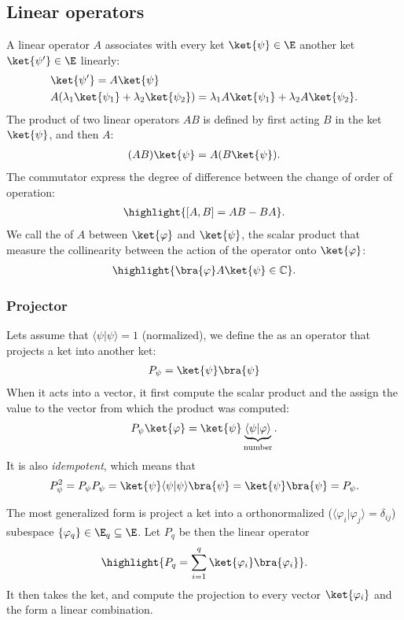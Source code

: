 \subsection{Linear operators}
A linear operator $A$ associates with every ket $\ket{\psi}\in\E$ another ket $\ket{\psi'}\in\E$ linearly:
\begin{align}
    &\ket{\psi'}=A\ket{\psi}\\
    &A(\lambda_1\ket{\psi_1}+\lambda_2\ket{\psi_2})=\lambda_1A\ket{\psi_1}+\lambda_2A\ket{\psi_2}.
\end{align} 
The product of two linear operators $AB$ is defined by first acting $B$ in the ket $\ket{\psi}$, and then $A$:
\begin{align}
    (AB)\ket{\psi}=A(B\ket{\psi}).
\end{align}
The commutator express the degree of difference between the change of order of operation:
\begin{align}
    \highlight{[A,B]=AB-BA}.
\end{align}
We call the  of $A$ between $\ket{\varphi}$ and $\ket{\psi}$, the scalar product that measure the collinearity 
between the action of the operator onto $\ket{\varphi}$:
\begin{align}
    \highlight{\bra{\varphi}A\ket{\psi}\in\mathbb{C}}.
\end{align}
\subsubsection{Projector}
Lets assume that $\langle\psi|\psi\rangle=1$ (normalized), we define the  as an operator that projects a ket into another ket:
\begin{align}
    P_{\psi}=\ket{\psi}\bra{\psi}
\end{align}
When it acts into a vector, it first compute the scalar product and the assign the value to the vector from which the product was computed:
\begin{align*}
    P_{\psi}\ket{\varphi}=\ket{\psi}\underbrace{\langle\psi|\varphi\rangle}_{\text{number}}.
\end{align*}
It is also \emph{idempotent}, which means that 
\begin{align}
    P^2_\psi=P_\psi P_\psi=\ket{\psi}\langle\psi|\psi\rangle\bra{\psi}=\ket{\psi}\bra{\psi}=P_\psi.
\end{align}

The most generalized form is project a ket into a orthonormalized ($\langle\varphi_i|\varphi_j\rangle=\delta_{ij}$) subespace $\{\varphi_q\}\in\E_q\subseteq\E$. Let $P_q$ be then the linear operator
\begin{align}
    \highlight{P_q=\sum_{i=1}^q\ket{\varphi_i}\bra{\varphi_i}}.
\end{align}
It then takes the ket, and compute the projection to every vector $\ket{\varphi_i}$ and the form a linear combination.
